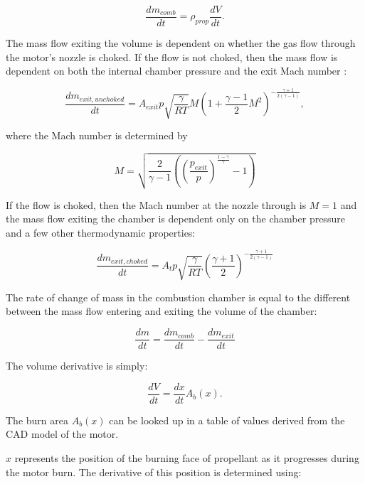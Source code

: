 \documentclass[12pt, letterpaper]{article}
\begin{document}
\begin{equation}
  \frac{dm_{comb}}{dt} = \rho_{prop} \frac{dV}{dt}.
\end{equation}

The mass flow exiting the volume is dependent on whether the gas flow through the motor's nozzle is choked. If the flow is not choked, then the mass flow is dependent on both the internal chamber pressure and the exit Mach number :

\begin{equation}
  \frac{dm_{exit, unchoked}}{dt} = A_{exit} p \sqrt{\frac{\gamma}{R T}} M \left( 1 + \frac{\gamma - 1}{2} M^2 \right)^{- \frac{\gamma + 1}{2 (\gamma - 1)}}, 
\end{equation}

where the Mach number is determined by

\begin{equation}
  M = \sqrt{ \frac{2}{\gamma - 1} \left( { \left( \frac{p_{exit}}{p} \right)}^{\frac{1 - \gamma}{\gamma}} - 1 \right)}
\end{equation}

If the flow is choked, then the Mach number at the nozzle through is $M = 1$ and the mass flow exiting the chamber is dependent only on the chamber pressure and a few other thermodynamic properties:

\begin{equation}
  \frac{dm_{exit, choked}}{dt} = A_t p \sqrt{\frac{\gamma}{R T}}\left( {\frac{\gamma + 1}{2}} \right)^{- \frac{\gamma + 1}{2 (\gamma - 1)}}
\end{equation}

The rate of change of mass in the combustion chamber is equal to the different between the mass flow entering and exiting the volume of the chamber: 

\begin{equation}
  \frac{dm}{dt} = \frac{dm_{comb}}{dt} - \frac{dm_{exit}}{dt}
\end{equation}

The volume derivative is simply:

\begin{equation}
  \frac{dV}{dt} = \frac{dx}{dt} A_b(x) .
\end{equation}

The burn area $A_b(x)$ can be looked up in a table of values derived from the CAD model of the motor. 

$x$ represents the position of the burning face of propellant as it progresses during the motor burn. The derivative of this position is determined using:
\end{document}
